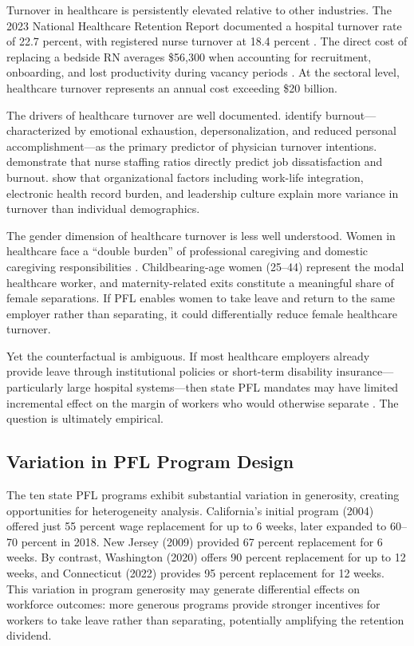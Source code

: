\documentclass[12pt]{article}
\begin{document}
Turnover in healthcare is persistently elevated relative to other industries. The 2023 National Healthcare Retention Report documented a hospital turnover rate of 22.7 percent, with registered nurse turnover at 18.4 percent \citep{nsi2024}. The direct cost of replacing a bedside RN averages \$56,300 when accounting for recruitment, onboarding, and lost productivity during vacancy periods \citep{nsi2024}. At the sectoral level, healthcare turnover represents an annual cost exceeding \$20 billion.

The drivers of healthcare turnover are well documented. \citet{shanafelt2017} identify burnout---characterized by emotional exhaustion, depersonalization, and reduced personal accomplishment---as the primary predictor of physician turnover intentions. \citet{aiken2002} demonstrate that nurse staffing ratios directly predict job dissatisfaction and burnout. \citet{dyrbye2019} show that organizational factors including work-life integration, electronic health record burden, and leadership culture explain more variance in turnover than individual demographics.

The gender dimension of healthcare turnover is less well understood. Women in healthcare face a ``double burden'' of professional caregiving and domestic caregiving responsibilities \citep{greenhaus2003}. Childbearing-age women (25--44) represent the modal healthcare worker, and maternity-related exits constitute a meaningful share of female separations. If PFL enables women to take leave and return to the same employer rather than separating, it could differentially reduce female healthcare turnover.

Yet the counterfactual is ambiguous. If most healthcare employers already provide leave through institutional policies or short-term disability insurance---particularly large hospital systems---then state PFL mandates may have limited incremental effect on the margin of workers who would otherwise separate \citep{bartel2021}. The question is ultimately empirical.

\subsection{Variation in PFL Program Design}

The ten state PFL programs exhibit substantial variation in generosity, creating opportunities for heterogeneity analysis. California's initial program (2004) offered just 55 percent wage replacement for up to 6 weeks, later expanded to 60--70 percent in 2018. New Jersey (2009) provided 67 percent replacement for 6 weeks. By contrast, Washington (2020) offers 90 percent replacement for up to 12 weeks, and Connecticut (2022) provides 95 percent replacement for 12 weeks. This variation in program generosity may generate differential effects on workforce outcomes: more generous programs provide stronger incentives for workers to take leave rather than separating, potentially amplifying the retention dividend.
\end{document}

